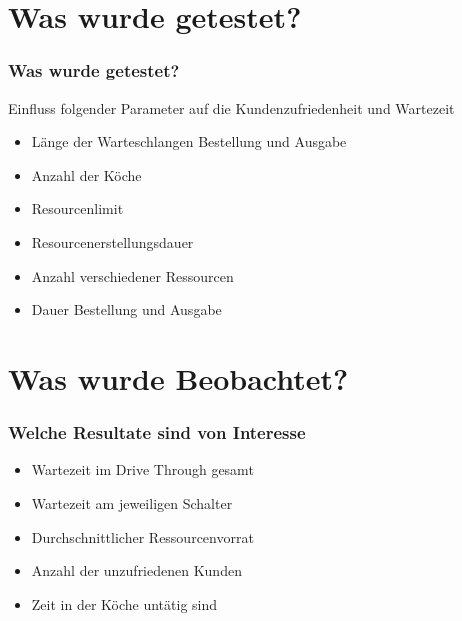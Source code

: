 \documentclass{beamer}
\begin{document}
\section{Was wurde getestet?}
\begin{frame} %
  \frametitle{Was wurde getestet? } %
  Einfluss folgender Parameter auf die Kundenzufriedenheit und Wartezeit
  
 \begin{itemize}
 \item Länge der Warteschlangen Bestellung und Ausgabe
 \item Anzahl der Köche 
 \item Resourcenlimit
 \item Resourcenerstellungsdauer
 \item Anzahl verschiedener Ressourcen
 \item Dauer Bestellung und Ausgabe
 
 \end{itemize}
\end{frame}

\section{Was wurde Beobachtet?}
\begin{frame} %
  \frametitle{Welche Resultate sind von Interesse } %

  
 \begin{itemize}
 \item Wartezeit im Drive Through gesamt
 \item Wartezeit am jeweiligen Schalter
 \item Durchschnittlicher Ressourcenvorrat
 \item Anzahl der unzufriedenen Kunden
 \item Zeit in der Köche untätig sind
 
 \end{itemize}
\end{frame}
\end{document}
